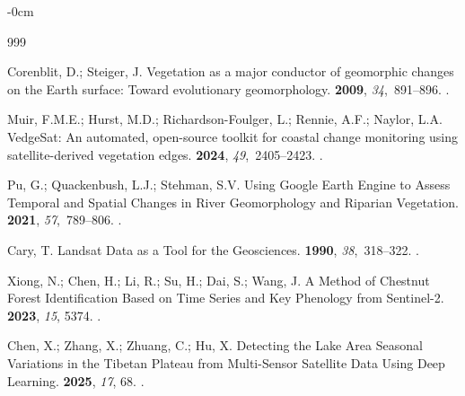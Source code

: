 \documentclass[geomatics,article,accept,pdftex,oneauthor]{Definitions/mdpi}
\begin{document}
\begin{adjustwidth}{-\extralength}{0cm}


\begin{thebibliography}{999}

Corenblit, D.; Steiger, J.
\newblock Vegetation as a major conductor of geomorphic changes on the Earth
  surface: Toward evolutionary geomorphology.
 {\bf 2009}, {\em
  34},~891--896.
.

Muir, F.M.E.; Hurst, M.D.; Richardson-Foulger, L.; Rennie, A.F.; Naylor, L.A.
\newblock VedgeSat: An automated, open-source toolkit for coastal change
  monitoring using satellite-derived vegetation edges.
 {\bf 2024}, {\em
  49},~2405--2423.
.

Pu, G.; Quackenbush, L.J.; Stehman, S.V.
\newblock Using Google Earth Engine to Assess Temporal and Spatial Changes in
  River Geomorphology and Riparian Vegetation.
 {\bf
  2021}, {\em 57},~789--806.
.

Cary, T.
\newblock Landsat Data as a Tool for the Geosciences.
 {\bf 1990}, {\em 38},~318--322.
.

Xiong, N.; Chen, H.; Li, R.; Su, H.; Dai, S.; Wang, J.
\newblock A Method of Chestnut Forest Identification Based on Time Series and
  Key Phenology from Sentinel-2.
 {\bf 2023}, {\em 15}, 5374.
.

Chen, X.; Zhang, X.; Zhuang, C.; Hu, X.
\newblock Detecting the Lake Area Seasonal Variations in the Tibetan Plateau
  from Multi-Sensor Satellite Data Using Deep Learning.
 {\bf 2025}, {\em 17}, 68.
.


\end{thebibliography}
\end{adjustwidth}
\end{document}
